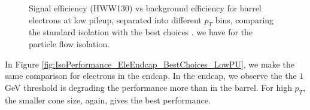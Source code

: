 \begin{figure}[!htbp]
\begin{center}
\caption{ Signal efficiency (HWW130) vs background efficiency for barrel electrons at low pileup, 
separated into different $p_{T}$ bins, comparing the standard isolation with the best choices .
we have for the particle flow isolation.}
\label{fig:IsoPerformance_EleBarrel_BestChoices_LowPU}
\end{center}
\end{figure}

\clearpage

In Figure \ref{fig:IsoPerformance_EleEndcap_BestChoices_LowPU}, we make the same comparison for 
electrons in the endcap. In the endcap, we observe the the $1$ GeV threshold is degrading the 
performance more than in the barrel. For high $p_{T}$, the smaller cone size, again,
gives the best performance. 


